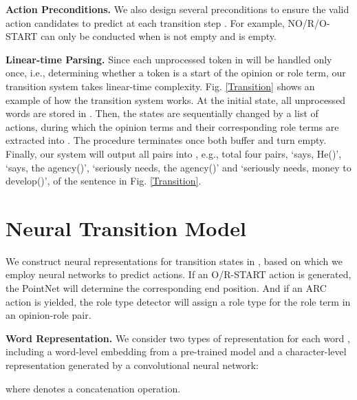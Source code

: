 \documentclass[letterpaper]{article} \usepackage{aaai22}  \usepackage{times}  \usepackage{helvet}  \usepackage{courier}  \usepackage[hyphens]{url}  \usepackage{graphicx} \urlstyle{rm} \def\UrlFont{\rm}  \usepackage{natbib}  \usepackage{caption} \DeclareCaptionStyle{ruled}{labelfont=normalfont,labelsep=colon,strut=off} \frenchspacing  \setlength{\pdfpagewidth}{8.5in}  \setlength{\pdfpageheight}{11in}  \usepackage{algorithm}
\begin{document}
\noindent\textbf{Action Preconditions.}
We also design several preconditions \cite{fan-etal-2020-transition} to ensure the valid action candidates to predict at each transition step .
For example, NO/R/O-START can only be conducted when  is not empty and  is empty.





\noindent\textbf{Linear-time Parsing.}
Since each unprocessed token in  will be handled only once, i.e., determining whether a token is a start of the opinion or role term, our transition system takes linear-time complexity.
Fig. \ref{Transition} shows an example of how the transition system works.
At the initial state, all unprocessed words are stored in .
Then, the states are sequentially changed by a list of actions, during which the opinion terms and their corresponding role terms are extracted into .
The procedure terminates once both buffer  and  turn empty.
Finally, our system will output all pairs into , e.g., total four pairs, `says, He()', `says, the agency()', `seriously needs, the agency()' and `seriously needs, money to develop()', of the sentence in Fig. \ref{Transition}.













\section{Neural Transition Model}

We construct neural representations for transition states in , based on which we employ neural networks to predict actions.
If an O/R-START action is generated, the PointNet will determine the corresponding end position.
And if an ARC action is yielded, the role type detector will assign a role type for the role term in an opinion-role pair.



\noindent\textbf{Word Representation.}
We consider two types of representation for each word , including a word-level embedding  from a pre-trained model and a character-level representation  generated by a convolutional neural network:

where  denotes a concatenation operation.
\end{document}
